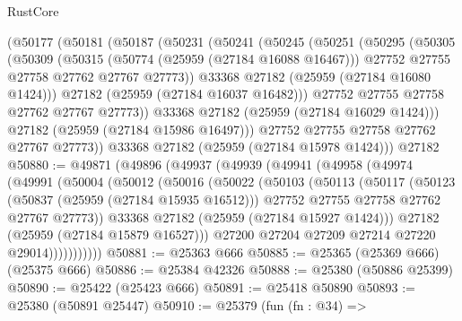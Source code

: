 \begin{lexlean}{RustCore}
\begin{coremodule}
    (@50177
      (@50181
        (@50187
          (@50231
            (@50241
              (@50245
                (@50251
                  (@50295
                    (@50305
                      (@50309
                        (@50315
                          (@50774 (@25959 (@27184 @16088 @16467)))
                          @27752
                          @27755
                          @27758
                          @27762
                          @27767
                          @27773))
                      @33368
                      @27182
                      (@25959 (@27184 @16080 @1424)))
                    @27182
                    (@25959 (@27184 @16037 @16482)))
                  @27752
                  @27755
                  @27758
                  @27762
                  @27767
                  @27773))
              @33368
              @27182
              (@25959 (@27184 @16029 @1424)))
            @27182
            (@25959 (@27184 @15986 @16497)))
          @27752
          @27755
          @27758
          @27762
          @27767
          @27773))
      @33368
      @27182
      (@25959 (@27184 @15978 @1424)))
    @27182
@50880 := @49871
    (@49896
      (@49937
        (@49939
          (@49941
            (@49958
              (@49974
                (@49991
                  (@50004
                    (@50012
                      (@50016
                        (@50022
                          (@50103
                            (@50113
                              (@50117
                                (@50123
                                  (@50837 (@25959 (@27184 @15935 @16512)))
                                  @27752
                                  @27755
                                  @27758
                                  @27762
                                  @27767
                                  @27773))
                              @33368
                              @27182
                              (@25959 (@27184 @15927 @1424)))
                            @27182
                            (@25959 (@27184 @15879 @16527)))
                          @27200
                          @27204
                          @27209
                          @27214
                          @27220
                          @29014)))))))))))
@50881 := @25363 @666
@50885 := @25365 (@25369 @666) (@25375 @666)
@50886 := @25384 @42326
@50888 := @25380 (@50886 @25399)
@50890 := @25422 (@25423 @666)
@50891 := @25418 @50890
@50893 := @25380 (@50891 @25447)
@50910 := @25379
    (fun (fn : @34) =>

\end{coremodule}
\end{lexlean}
